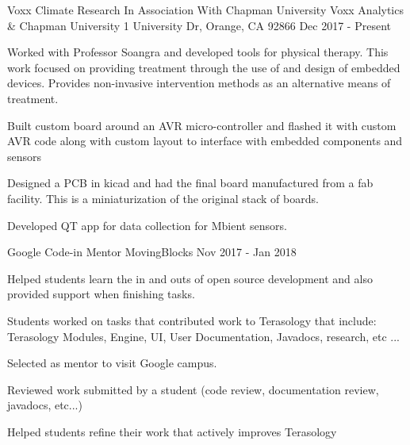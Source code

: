 \begin{cventries}
  \cventry
    {Voxx Climate Research In Association With Chapman University} %
    {Voxx Analytics \& Chapman University} %
    {1 University Dr, Orange, CA 92866} %
    { Dec 2017 - Present} %
    {
      \begin{cvitems} %
        \item {Worked with Professor Soangra and developed tools for physical therapy. This work focused on providing treatment through the use of and design of embedded devices. Provides non-invasive intervention methods as an alternative means of treatment.}
        \item {Built custom board around an AVR micro-controller and flashed it with custom AVR code along with custom layout to interface with embedded components and sensors}
        \item {Designed a PCB in kicad and had the final board manufactured from a fab facility. This is a miniaturization of the original stack of boards.}
         \item {Developed QT app for data collection for Mbient sensors.}
      \end{cvitems}
    }


  \cventry
    {Google Code-in Mentor} %
    {MovingBlocks} %
    {} %
    { Nov 2017 - Jan 2018} %
    {
      \begin{cvitems} %
        \item {Helped students learn the in and outs of open source development and also provided support when finishing tasks.}
        \item {Students worked on tasks that contributed work to Terasology that include: Terasology Modules, Engine, UI, User Documentation, Javadocs, research, etc ...}
        \item {Selected as mentor to visit Google campus.}
        \item {Reviewed work submitted by a student (code review, documentation review, javadocs, etc...)}
         \item { Helped students refine their work that actively improves Terasology}
      \end{cvitems}
    }

\end{cventries}
